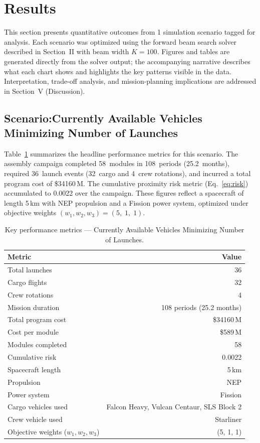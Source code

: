 \section{Results}

This section presents quantitative outcomes from
1 simulation scenario
tagged for analysis. Each scenario was optimized using the
forward beam search solver described in Section~II with beam
width $K = 100$. Figures and tables are generated directly from
the solver output; the accompanying narrative describes what each
chart shows and highlights the key patterns visible in the data.
Interpretation, trade-off analysis, and mission-planning
implications are addressed in Section~V (Discussion).


\subsection{Scenario:Currently Available Vehicles Minimizing Number of Launches}

Table~\ref{tab:metrics_1} summarizes the headline
performance metrics for this scenario.
The assembly campaign completed
58~modules in
108~periods
(25.2~months),
required 36~launch
events
(32~cargo and 4~crew
rotations),
and incurred a total program cost of
\$34160\,M.
The cumulative proximity risk metric
(Eq.~\ref{eq:risk}) accumulated to
0.0022 over the campaign.
These figures reflect a spacecraft of length
5\,km with
NEP propulsion and a
Fission power system, optimized
under objective weights
$(w_1, w_2, w_3) =
(5,\;
 1,\;
 1)$.

\begin{table}[htbp]
\centering
\caption{Key performance metrics ---
         Currently Available Vehicles Minimizing Number of Launches.}
\label{tab:metrics_1}
\begin{tabular}{lr}
\toprule
Metric & Value \\
\midrule
Total launches        & 36 \\
\quad Cargo flights   & 32 \\
\quad Crew rotations  & 4 \\
Mission duration      & 108 periods
                        (25.2 months) \\
Total program cost    & \$34160\,M \\
Cost per module       & \$589\,M \\
Modules completed     & 58 \\
Cumulative risk       & 0.0022 \\
Spacecraft length     & 5\,km \\
Propulsion            & NEP \\
Power system          & Fission \\
Cargo vehicles used &
  Falcon Heavy, Vulcan Centaur, SLS Block 2 \\
Crew vehicle used &
  Starliner \\
Objective weights ($w_1, w_2, w_3$) &
  (5,
   1,
   1) \\
\bottomrule
\end{tabular}
\end{table}

